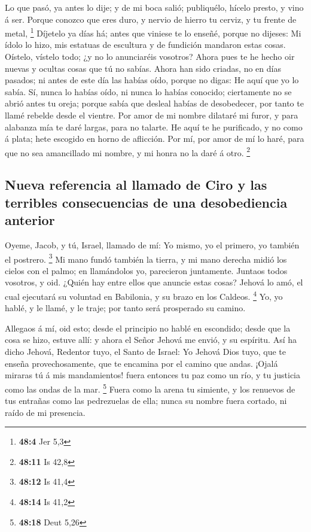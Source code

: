  Lo que pasó, ya antes lo dije; y de mi boca salió;
publiquélo, hícelo presto, y vino á ser.  Porque conozco
que eres duro, y nervio de hierro tu cerviz, y tu frente de metal,
\footnote{\textbf{48:4} Jer 5,3}  Díjetelo ya días há;
antes que viniese te lo enseñé, porque no dijeses: Mi ídolo lo hizo, mis
estatuas de escultura y de fundición mandaron estas cosas.
 Oístelo, vístelo todo; ¿y no lo anunciaréis vosotros?
Ahora pues te he hecho oir nuevas y ocultas cosas que tú no sabías.
 Ahora han sido criadas, no en días pasados; ni antes de
este día las habías oído, porque no digas: He aquí que yo lo sabía.
 Sí, nunca lo habías oído, ni nunca lo habías conocido;
ciertamente no se abrió antes tu oreja; porque sabía que desleal habías
de desobedecer, por tanto te llamé rebelde desde el vientre.
 Por amor de mi nombre dilataré mi furor, y para alabanza
mía te daré largas, para no talarte.  He aquí te he
purificado, y no como á plata; hete escogido en horno de aflicción.
 Por mí, por amor de mí lo haré, para que no sea
amancillado mi nombre, y mi honra no la daré á otro. \footnote{\textbf{48:11}
  Is 42,8}

\hypertarget{nueva-referencia-al-llamado-de-ciro-y-las-terribles-consecuencias-de-una-desobediencia-anterior}{%
\subsection{Nueva referencia al llamado de Ciro y las terribles
consecuencias de una desobediencia
anterior}\label{nueva-referencia-al-llamado-de-ciro-y-las-terribles-consecuencias-de-una-desobediencia-anterior}}

 Oyeme, Jacob, y tú, Israel, llamado de mí: Yo mismo, yo
el primero, yo también el postrero. \footnote{\textbf{48:12} Is 41,4}
 Mi mano fundó también la tierra, y mi mano derecha midió
los cielos con el palmo; en llamándolos yo, parecieron juntamente.
 Juntaos todos vosotros, y oid. ¿Quién hay entre ellos
que anuncie estas cosas? Jehová lo amó, el cual ejecutará su voluntad en
Babilonia, y su brazo en los Caldeos. \footnote{\textbf{48:14} Is 41,2}
 Yo, yo hablé, y le llamé, y le traje; por tanto será
prosperado su camino.

 Allegaos á mí, oid esto; desde el principio no hablé en
escondido; desde que la cosa se hizo, estuve allí: y ahora el Señor
Jehová me envió, y su espíritu.  Así ha dicho Jehová,
Redentor tuyo, el Santo de Israel: Yo Jehová Dios tuyo, que te enseña
provechosamente, que te encamina por el camino que andas.
 ¡Ojalá miraras tú á mis mandamientos! fuera entonces tu
paz como un río, y tu justicia como las ondas de la mar. \footnote{\textbf{48:18}
  Deut 5,26}  Fuera como la arena tu simiente, y los
renuevos de tus entrañas como las pedrezuelas de ella; nunca su nombre
fuera cortado, ni raído de mi presencia.

